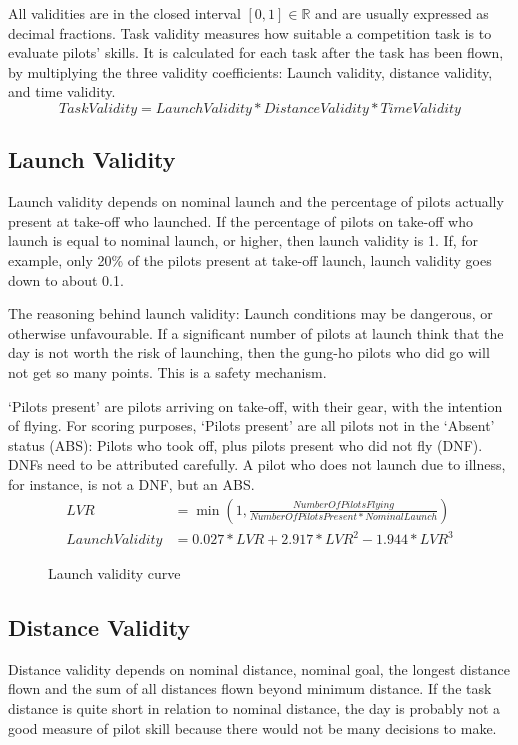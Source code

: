 \documentclass[gap.tex]{subfiles}
\begin{document}
\label{sec:task-validity}
All validities are in the closed interval $[0, 1]\in\mathbb{R}$ and are usually
expressed as decimal fractions. Task validity measures how suitable
a competition task is to evaluate pilots’ skills. It is calculated for each
task after the task has been flown, by multiplying the three validity
coefficients: Launch validity, distance validity, and time validity.
\begin{equation*}
    TaskValidity = LaunchValidity * DistanceValidity * TimeValidity
\end{equation*}

\subsection{Launch Validity}
\label{sec:launch-validity}
Launch validity depends on nominal launch and the percentage of pilots actually
present at take-off who launched. If the percentage of pilots on take-off who
launch is equal to nominal launch, or higher, then launch validity is 1. If,
for example, only 20\% of the pilots present at take-off launch, launch
validity goes down to about 0.1.

The reasoning behind launch validity: Launch conditions may be dangerous, or
otherwise unfavourable.  If a significant number of pilots at launch think that
the day is not worth the risk of launching, then the gung-ho pilots who did go
will not get so many points. This is a safety mechanism.

‘Pilots present’ are pilots arriving on take-off, with their gear, with the
intention of flying. For scoring purposes, ‘Pilots present’ are all pilots not
in the ‘Absent’ status (ABS): Pilots who took off, plus pilots present who did
not fly (DNF). DNFs need to be attributed carefully. A pilot who does not
launch due to illness, for instance, is not a DNF, but an ABS.
\begin{align*}
    LVR &= \min(1, \frac{NumberOfPilotsFlying}{NumberOfPilotsPresent * NominalLaunch}) \\
    LaunchValidity &= 0.027 * LVR + 2.917 * LVR^2 - 1.944 * LVR^3
\end{align*}

\begin{figure}[!ht]
    \centering
    
    \caption{Launch validity curve}
\end{figure}

\subsection{Distance Validity}
\label{sec:distance-validity}
Distance validity depends on nominal distance, nominal goal, the longest
distance flown and the sum of all distances flown beyond minimum distance. If
the task distance is quite short in relation to nominal distance, the day is
probably not a good measure of pilot skill because there would not be many
decisions to make.
\end{document}
